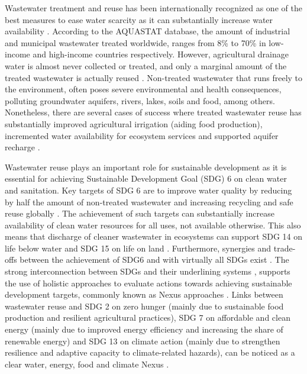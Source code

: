 Wastewater treatment and reuse has been internationally recognized as one of the best measures to ease water scarcity as it can substantially increase water availability \cite{unescoWastewaterUntappedResource2017,GARCIA2015154}. According to the AQUASTAT database, the amount of industrial and municipal wastewater treated worldwide, ranges from 8\% to 70\% in low-income and high-income countries respectively. However, agricultural drainage water is almost never collected or treated, and only a marginal amount of the treated wastewater is actually reused \cite{unescoWastewaterUntappedResource2017}. Non-treated wastewater that runs freely to the environment, often poses severe environmental and health consequences, polluting groundwater aquifers, rivers, lakes, soils and food, among others. Nonetheless, there are several cases of success where treated wastewater reuse has substantially improved agricultural irrigation (aiding food production), incremented water availability for ecosystem services and supported aquifer recharge \cite{hettiarachchiSAFEUSEWASTEWATERa, halalshehPolicyGovernanceFramework2018, mahjoubPublicAcceptanceWastewater2018, zuurbierUseWastewaterManaged2018, hussainSustainableUseManagement2019}.

Wastewater reuse plays an important role for sustainable development as it is essential for achieving Sustainable Development Goal (SDG) 6 on clean water and sanitation. Key targets of SDG 6 are to improve water quality by reducing by half the amount of non-treated wastewater and increasing recycling and safe reuse globally \cite{UNSDGs2019, tortajadaContributionsRecycledWastewater2020}. The achievement of such targets can substantially increase availability of clean water resources for all uses, not available otherwise. This also means that discharge of cleaner wastewater in ecosystems can support SDG 14 on life below water and SDG 15 on life on land \cite{UNSDGs2019, tortajadaContributionsRecycledWastewater2020}. Furthermore, synergies and trade-offs between the achievement of SDG6 and with virtually all SDGs exist \cite{WaterSanitationInterlinkages2016}. The strong interconnection between SDGs and their underlining systems \cite{WaterSanitationInterlinkages2016,fusoneriniMappingSynergiesTradeoffs2018,fusoneriniConnectingClimateAction2019}, supports the use of holistic approaches to evaluate actions towards achieving sustainable development targets, commonly known as Nexus approaches \cite{liuNexusApproachesGlobal2018,bleischwitzResourceNexusPerspectives2018,olawuyiSustainableDevelopmentWaterenergyfood2020,simpsonDevelopmentWaterEnergyFoodNexus2019,hoffNexusApproachMENA2019}. Links between wastewater reuse and SDG 2 on zero hunger (mainly due to sustainable food production and resilient agricultural practices), SDG 7 on affordable and clean energy (mainly due to improved energy efficiency and increasing the share of renewable energy) and SDG 13 on climate action (mainly due to strengthen resilience and adaptive capacity to climate-related hazards), can be noticed as a clear water, energy, food and climate Nexus \cite{WaterSanitationInterlinkages2016,liuNexusApproachesGlobal2018,hoffNexusApproachMENA2019}.

